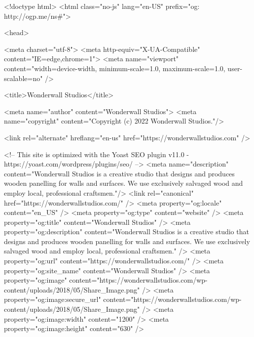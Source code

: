 <!doctype html>
<html class="no-js" lang="en-US" prefix="og: http://ogp.me/ns#">

<head>

  <meta charset="utf-8">
  <meta http-equiv="X-UA-Compatible" content="IE=edge,chrome=1">
  <meta name="viewport" content="width=device-width, minimum-scale=1.0, maximum-scale=1.0, user-scalable=no" />

  <title>Wonderwall Studios</title>

  <meta name="author" content="Wonderwall Studios">
  <meta name="copyright" content="Copyright (c) 2022 Wonderwall Studios."/>

  <link rel="alternate" hreflang="en-us" href="https://wonderwallstudios.com" />

<!-- This site is optimized with the Yoast SEO plugin v11.0 - https://yoast.com/wordpress/plugins/seo/ -->
<meta name="description" content="Wonderwall Studios is a creative studio that designs and produces wooden panelling for walls and surfaces. We use exclusively salvaged wood and employ local, professional craftsmen."/>
<link rel="canonical" href="https://wonderwallstudios.com/" />
<meta property="og:locale" content="en_US" />
<meta property="og:type" content="website" />
<meta property="og:title" content="Wonderwall Studios" />
<meta property="og:description" content="Wonderwall Studios is a creative studio that designs and produces wooden panelling for walls and surfaces. We use exclusively salvaged wood and employ local, professional craftsmen." />
<meta property="og:url" content="https://wonderwallstudios.com/" />
<meta property="og:site_name" content="Wonderwall Studios" />
<meta property="og:image" content="https://wonderwallstudios.com/wp-content/uploads/2018/05/Share_Image.png" />
<meta property="og:image:secure_url" content="https://wonderwallstudios.com/wp-content/uploads/2018/05/Share_Image.png" />
<meta property="og:image:width" content="1200" />
<meta property="og:image:height" content="630" />
